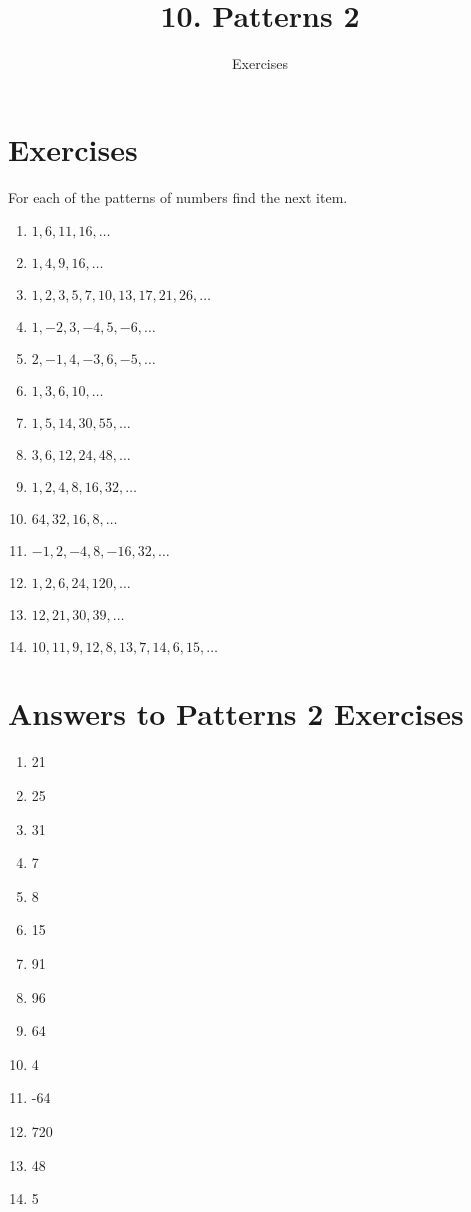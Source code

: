 \documentclass[11pt]{article}
\title{10. Patterns 2}
\author{Exercises}
\begin{document}
\maketitle
\section*{Exercises}
For each of the patterns of numbers find the next item.
\begin{enumerate}
	\item $1,6,11,16,\ldots$
	\item $1, 4, 9, 16, \ldots$
	\item $1, 2, 3, 5, 7, 10, 13, 17, 21, 26, \ldots$
	\item $1, -2, 3, -4, 5, -6, \ldots$
	\item $2, -1, 4, -3, 6, -5, \ldots$
	\item $1, 3, 6, 10, \ldots$
	\item $1, 5, 14, 30, 55, \ldots$
	\item $3, 6, 12, 24, 48,\ldots$
	\item $1, 2, 4, 8, 16, 32, \ldots$
	\item $64, 32, 16, 8, \ldots$
	\item $-1, 2, -4, 8, -16, 32, \ldots$
	\item $1, 2, 6, 24, 120, \ldots$
	\item $12, 21, 30, 39, \ldots$
	\item $10, 11, 9, 12, 8, 13, 7, 14, 6, 15,\ldots$
\end{enumerate}
\newpage
\section*{Answers to Patterns 2 Exercises}
\begin{enumerate}
	\item 21
	\item 25
	\item 31
	\item 7
	\item 8
	\item 15
	\item 91
	\item 96
	\item 64
	\item 4
	\item -64
	\item 720
	\item 48
	\item 5
\end{enumerate}
\end{document}
